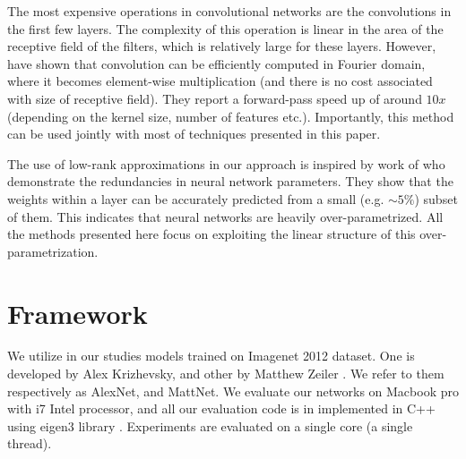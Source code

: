 


The most expensive operations in convolutional networks are the
convolutions in the first few layers. The complexity of this operation
is linear in the area of the receptive field of the filters, which is
relatively large for these layers.  However, \cite{mathieu2013fast} have shown that convolution can be
efficiently computed in Fourier domain, where it becomes element-wise
multiplication (and there is no cost associated with size of receptive
field). They report a forward-pass speed up of around $10x$ (depending on
the kernel size, number of features etc.).  Importantly, this method can
be used jointly with most of techniques presented in this paper.

The use of low-rank approximations in our approach is inspired by work
of \cite{denil2013predicting} who demonstrate the redundancies in neural
network parameters. They show that the weights within a layer can be
accurately predicted from a small (e.g. $\sim 5\%$) subset of them. This
indicates that neural networks are heavily over-parametrized.  All the
methods presented here focus on exploiting the linear structure of this
over-parametrization.

\section{Framework}
We utilize in our studies models trained on Imagenet 2012 dataset. One is developed
by Alex Krizhevsky\cite{krizhevsky2012imagenet}, and other by Matthew Zeiler \cite{zeiler2013visualizing}.
We refer to them respectively as AlexNet, and MattNet. We evaluate our networks on Macbook pro with i7 Intel processor, and
all our evaluation code is in implemented in C++ using eigen3 library \cite{eigenweb}. Experiments are 
evaluated on a single core (a single thread).
